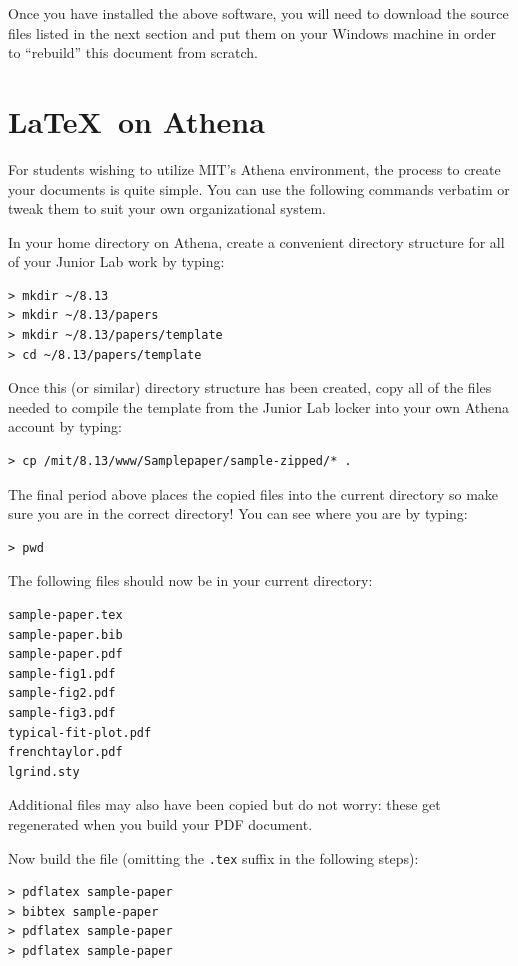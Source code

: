 Once you have installed the above software, you will need to download
the source files listed in the next section and put them on your
Windows machine in order to ``rebuild'' this document from scratch.


\section{\LaTeX\ on Athena}
For students wishing to utilize MIT's Athena environment, the
 process to create your documents is quite simple.  You can use the following
commands verbatim or tweak them to suit your own organizational system.

In your home directory on Athena, create a convenient directory structure 
for all of your Junior Lab
work by typing:
\begin{verbatim}
> mkdir ~/8.13
> mkdir ~/8.13/papers
> mkdir ~/8.13/papers/template
> cd ~/8.13/papers/template
\end{verbatim}
Once this (or similar) directory structure has been created, copy all
of the files needed to compile the template from the Junior Lab locker
into your own Athena account by typing:
\begin{verbatim}
> cp /mit/8.13/www/Samplepaper/sample-zipped/* .
\end{verbatim}
The final period above places the
copied files into the current directory so make sure you are in the
correct directory!
  You can see where you are by typing:
\begin{verbatim}
> pwd
\end{verbatim}
The following files should now be in
your current directory:
\begin{verbatim}
sample-paper.tex
sample-paper.bib
sample-paper.pdf
sample-fig1.pdf
sample-fig2.pdf
sample-fig3.pdf
typical-fit-plot.pdf
frenchtaylor.pdf
lgrind.sty
\end{verbatim}
Additional files may also have been copied but do not worry: these get
regenerated when you build your PDF document.

Now build the file (omitting the \texttt{.tex} suffix in the 
following steps):
\begin{verbatim}
> pdflatex sample-paper
> bibtex sample-paper
> pdflatex sample-paper
> pdflatex sample-paper
\end{verbatim}



